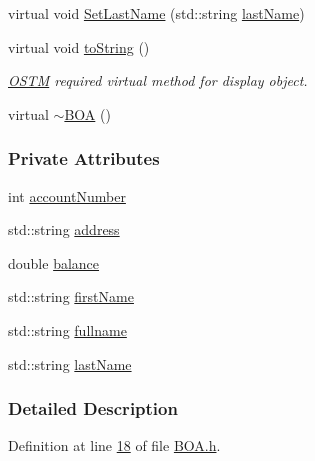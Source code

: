 \begin{DoxyCompactItemize}
\item 
virtual void \hyperlink{class_b_o_a_a7ea44308c05532cd11ff3ce8f14ea4c2_a7ea44308c05532cd11ff3ce8f14ea4c2}{Set\+Last\+Name} (std\+::string \hyperlink{class_b_o_a_ab7749e6e945beaca57a3ef01259c6fea_ab7749e6e945beaca57a3ef01259c6fea}{last\+Name})
\item 
virtual void \hyperlink{class_b_o_a_a348df0299997f81bcad0ec034dab0b8d_a348df0299997f81bcad0ec034dab0b8d}{to\+String} ()
\begin{DoxyCompactList}\small\item\em \hyperlink{class_o_s_t_m}{O\+S\+TM} required virtual method for display object. \end{DoxyCompactList}\item 
virtual \hyperlink{class_b_o_a_abe27b17a23ceffc6269dbe6d81de5212_abe27b17a23ceffc6269dbe6d81de5212}{$\sim$\+B\+OA} ()
\end{DoxyCompactItemize}
\subsubsection*{Private Attributes}
\begin{DoxyCompactItemize}
\item 
int \hyperlink{class_b_o_a_a86ca4ad716db205f04c337b39b34d9ba_a86ca4ad716db205f04c337b39b34d9ba}{account\+Number}
\item 
std\+::string \hyperlink{class_b_o_a_afb2d7d0c5c05169a72bbc6f1d2cc737f_afb2d7d0c5c05169a72bbc6f1d2cc737f}{address}
\item 
double \hyperlink{class_b_o_a_a2061c36a15924de9186ec5c83dc7da2f_a2061c36a15924de9186ec5c83dc7da2f}{balance}
\item 
std\+::string \hyperlink{class_b_o_a_acb1b3b2a69e403c4e0e3fb08fdbb52a0_acb1b3b2a69e403c4e0e3fb08fdbb52a0}{first\+Name}
\item 
std\+::string \hyperlink{class_b_o_a_aed3225e383c08b1b7c962a0e43b180d1_aed3225e383c08b1b7c962a0e43b180d1}{fullname}
\item 
std\+::string \hyperlink{class_b_o_a_ab7749e6e945beaca57a3ef01259c6fea_ab7749e6e945beaca57a3ef01259c6fea}{last\+Name}
\end{DoxyCompactItemize}


\subsubsection{Detailed Description}


Definition at line \hyperlink{_b_o_a_8h_source_l00018}{18} of file \hyperlink{_b_o_a_8h_source}{B\+O\+A.\+h}.



